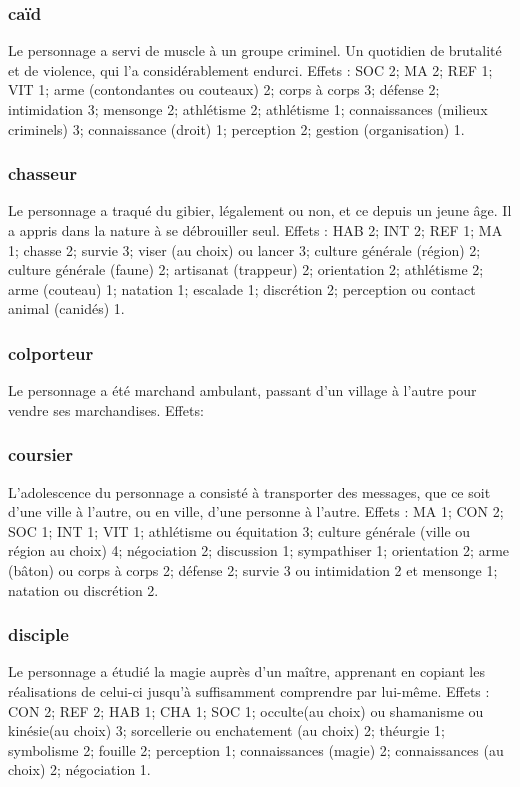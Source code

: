 \documentclass[10pt,a4paper,twocolumn]{book}
\begin{document}
\subsubsection{caïd}
Le personnage a servi de muscle à un groupe criminel. Un quotidien de brutalité et de violence, qui l’a considérablement endurci.
Effets : SOC 2; MA 2; REF 1; VIT 1; arme (contondantes ou couteaux) 2; corps à corps 3; défense 2; intimidation 3; mensonge 2; athlétisme 2; athlétisme 1; connaissances (milieux criminels) 3; connaissance (droit) 1; perception 2; gestion (organisation) 1.
\subsubsection{chasseur}
Le personnage a traqué du gibier, légalement ou non, et ce depuis un jeune âge. Il a appris dans la nature à se débrouiller seul.
Effets : HAB 2; INT 2; REF 1; MA 1; chasse 2; survie 3; viser (au choix) ou lancer 3; culture générale (région) 2; culture générale (faune) 2; artisanat (trappeur) 2; orientation 2; athlétisme 2; arme (couteau) 1; natation 1; escalade 1; discrétion 2; perception ou contact animal (canidés) 1.
\subsubsection{colporteur}
Le personnage a été marchand ambulant, passant d’un village à l’autre pour vendre ses marchandises.
Effets: 
\subsubsection{coursier}
L’adolescence du personnage a consisté à transporter des messages, que ce soit d’une ville à l’autre, ou en ville, d’une personne à l’autre.
Effets : MA 1; CON 2; SOC 1; INT 1; VIT 1; athlétisme ou équitation 3; culture générale (ville ou région au choix) 4; négociation 2; discussion 1; sympathiser 1; orientation 2; arme (bâton) ou corps à corps 2; défense 2; survie 3 ou intimidation 2 et mensonge 1; natation ou discrétion 2.
\subsubsection{disciple}
Le personnage a étudié la magie auprès d’un maître, apprenant en copiant les réalisations de celui-ci jusqu’à suffisamment comprendre par lui-même.
Effets : CON 2; REF 2; HAB 1; CHA 1; SOC 1; occulte(au choix) ou shamanisme ou kinésie(au choix) 3; sorcellerie ou enchatement (au choix) 2; théurgie 1; symbolisme 2; fouille 2; perception 1; connaissances (magie) 2; connaissances (au choix) 2; négociation 1.
\end{document}
